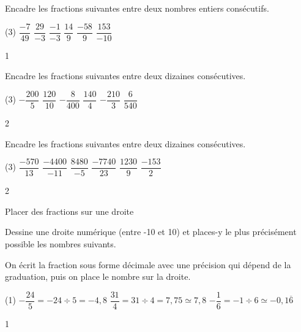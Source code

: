 \documentclass[a4paper,11pt]{report}
\begin{document}
\begin{exo}{
Encadre les fractions suivantes entre deux nombres entiers consécutifs.
	\begin{tasks}(3)
\task $\dfrac{-7}{49}$
\task $\dfrac{29}{-3}$
\task $\dfrac{-1}{-3}$
\task $\dfrac{14}{9}$
\task $\dfrac{-58}{9}$
\task $\dfrac{153}{-10}$
\end{tasks}
 \vspace{1pt}
}{1}\end{exo}


\begin{exo}{
Encadre les fractions suivantes entre deux dizaines consécutives.
	\begin{tasks}(3)
\task $-\dfrac{200}{5}$
\task $\dfrac{120}{10}$
\task $-\dfrac{8}{400}$
\task $\dfrac{140}{4}$
\task $-\dfrac{210}{3}$
\task $\dfrac{6}{540}$
\end{tasks}
 \vspace{1pt}
}{2}\end{exo}

\begin{exo}{
Encadre les fractions suivantes entre deux dizaines consécutives.
	\begin{tasks}(3)
\task $\dfrac{-570}{13}$
\task $\dfrac{-4400}{-11}$
\task $\dfrac{8480}{-5}$
\task $\dfrac{-7740}{23}$
\task $\dfrac{1230}{9}$
\task $\dfrac{-153}{2}$
\end{tasks}
 \vspace{1pt}
}{2}\end{exo}

\begin{resolu}{Placer des fractions sur une droite}{
Dessine une droite numérique (entre -10 et 10) et places-y le plus précisément possible les nombres suivants.

{\color{blue} On écrit la fraction sous forme décimale avec une précision qui dépend de la graduation, puis on place le nombre sur la droite. 
}

\begin{tasks}(1)
	\task $-\dfrac{24}{5}=-24\div 5=-4,8$
	\task $\dfrac{31}{4}=31\div 4=7,75\simeq 7,8$
	\task $-\dfrac{1}{6}=-1\div 6\simeq -0,1\overline{6}$
\end{tasks}
\centering
{}}{1}
\end{resolu}
\end{document}
